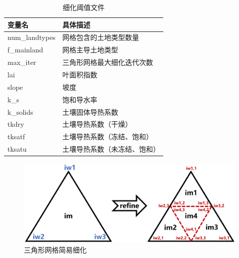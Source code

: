 {
\begin{table}[htbp]
\centering
\caption{细化阈值文件}
\label{tab:细化阈值文件}
\begin{tabular}{@{}ll@{}}
\toprule
变量名            & 具体描述           \\\midrule
num\_landtypes & 网格包含的土地类型数量    \\
f\_mainland    & 网格主导土地类型       \\
max\_iter      & 三角形网格最大细化迭代次数  \\
lai            & 叶面积指数          \\
slope          & 坡度             \\
k\_s           & 饱和导水率          \\
k\_solids      & 土壤固体导热系数       \\
tkdry          & 土壤导热系数（干燥）     \\
tksatf         & 土壤导热系数（冻结、饱和）  \\
tksatu         & 土壤导热系数（未冻结、饱和） \\\bottomrule
\end{tabular}
\end{table}
}

{
\begin{figure}[htbp]
\centering
\includegraphics[width=\textwidth]{Figures/模式构架/三角形网格简易细化.png}
\caption{三角形网格简易细化}
\label{fig:三角形网格简易细化}
\end{figure}
}

